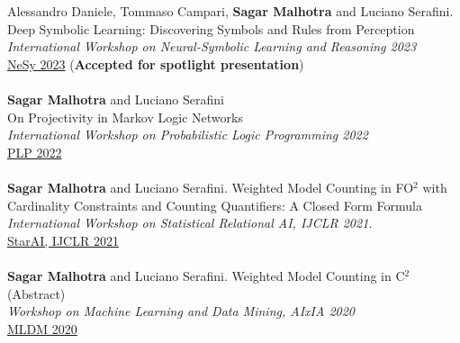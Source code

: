 \documentclass[10pt, a4paper]{article}
\newcommand{\years}[1]{\marginnote{\scriptsize #1}}
\begin{document}
\years{2023}Alessandro Daniele, Tommaso Campari, \textbf{Sagar Malhotra} and Luciano Serafini. \\ Deep Symbolic Learning: Discovering Symbols and Rules from Perception \\  
\emph{International Workshop on Neural-Symbolic Learning and Reasoning 2023}\\
\href{https://sites.google.com/view/nesy2023/home/nesy2023-programme-outline?authuser=0}{NeSy 2023} (\textbf{Accepted for spotlight presentation})\\ \\
\years{2022}\textbf{Sagar Malhotra} and Luciano Serafini\\
On Projectivity in Markov Logic Networks\\ 
\emph{International Workshop on Probabilistic Logic Programming 2022}\\ \href{https://easychair.org/publications/preprint/2lTk}{ PLP 2022}\\ \\
\years{2021}\textbf{Sagar Malhotra} and Luciano Serafini. Weighted Model Counting in FO$^2$ with Cardinality Constraints and Counting Quantifiers: A Closed Form Formula\\ \emph{International Workshop on Statistical Relational AI, IJCLR 2021. }\\
\href{https://starai.cs.kuleuven.be/2021/}{ StarAI, IJCLR 2021} \\ \\ 
\years{{2020}}\textbf{Sagar Malhotra} and Luciano Serafini. Weighted Model Counting in C$^2$ (Abstract) \\
\emph{Workshop on Machine Learning and Data Mining, AIxIA 2020}\\
 \href{https://sites.google.com/view/mldm2020-workshop/program?authuser=0}{MLDM 2020}

\end{document}

